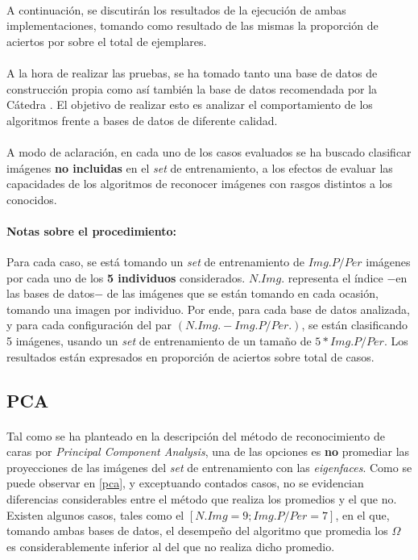 \documentclass[12pt, twocolumn]{article}
\begin{document}
	\paragraph{} A continuación, se discutirán los resultados de la ejecución de ambas implementaciones, tomando como resultado de las mismas la proporción de aciertos por sobre el total de ejemplares. 
	
	\paragraph{} A la hora de realizar las pruebas, se ha tomado tanto una base de datos de construcción propia como así también la base de datos recomendada por la Cátedra \cite{dbf}. El objetivo de realizar esto es analizar el comportamiento de los algoritmos frente a bases de datos de diferente calidad. 
	
	\paragraph{} A modo de aclaración, en cada uno de los casos evaluados se ha buscado clasificar imágenes \textbf{no incluidas} en el \textit{set} de entrenamiento, a los efectos de evaluar las capacidades de los algoritmos de reconocer imágenes con rasgos distintos a los conocidos.
	
	\paragraph{Notas sobre el procedimiento:} Para cada caso, se está tomando un \textit{set} de entrenamiento de $Img. P/Per$ imágenes por cada uno de los \textbf{5 individuos} considerados. $N.Img.$ representa el índice $-$en las bases de datos$-$ de las imágenes que se están tomando en cada ocasión, tomando una imagen por individuo. Por ende, para cada base de datos analizada, y para cada configuración del par $(N. Img. - Img. P/Per.)$, se están clasificando 5 imágenes, usando un \textit{set} de entrenamiento de un tamaño de $5*Img. P/Per.$ Los resultados están expresados en proporción de aciertos sobre total de casos.
	
	
	\subsection{PCA}
	
	\paragraph{} Tal como se ha planteado en la descripción del método de reconocimiento de caras por \textit{Principal Component Analysis}, una de las opciones es \textbf{no} promediar las proyecciones de las imágenes del \textit{set} de entrenamiento con las \textit{eigenfaces}. Como se puede observar en \ref{pca}, y exceptuando contados casos, no se evidencian diferencias considerables entre el método que realiza los promedios y el que no. Existen algunos casos, tales como el $[N. Img = 9; Img. P/Per = 7]$, en el que, tomando ambas bases de datos, el desempeño del algoritmo que promedia los $\Omega$ es considerablemente inferior al del que no realiza dicho promedio. 
	
\end{document}
